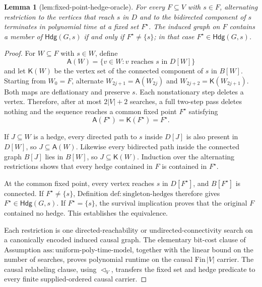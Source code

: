 \documentclass{article}
\newtheorem{lemma}{Lemma}
\begin{document}
\begin{lemma}[lem:fixed-point-hedge-oracle]\label{lem:fixed-point-hedge-oracle}
For every \(F\subseteq V\) with \(s\in F\), alternating restriction to the
vertices that reach \(s\) in \(D\) and to the bidirected component of \(s\)
terminates in polynomial time at a fixed set \(F^{\star}\).  The induced
graph on \(F\) contains a member of \(\mathsf{Hdg}(G,s)\) if and only if
\(F^{\star}\neq\{s\}\); in that case \(F^{\star}\in\mathsf{Hdg}(G,s)\).
\end{lemma}
\begin{proof}
For \(W\subseteq F\) with \(s\in W\), define
\[
 \mathsf A(W)=\{v\in W:v\text{ reaches }s\text{ in }D[W]\}
\]
and let \(\mathsf K(W)\) be the vertex set of the connected component of
\(s\) in \(B[W]\).  Starting from \(W_0=F\), alternate
\(W_{2j+1}=\mathsf A(W_{2j})\) and
\(W_{2j+2}=\mathsf K(W_{2j+1})\).  Both maps are deflationary and preserve
\(s\).  Each nonstationary step deletes a vertex.  Therefore, after at most
\(2|V|+2\) searches, a full two-step pass deletes nothing and the sequence
reaches a common fixed point \(F^{\star}\) satisfying
\[
 \mathsf A(F^{\star})=\mathsf K(F^{\star})=F^{\star}.
\]

If \(J\subseteq W\) is a hedge, every directed path to \(s\) inside
\(D[J]\) is also present in \(D[W]\), so \(J\subseteq\mathsf A(W)\).
Likewise every bidirected path inside the connected graph \(B[J]\) lies in
\(B[W]\), so \(J\subseteq\mathsf K(W)\).  Induction over the alternating
restrictions shows that every hedge contained in \(F\) is contained in
\(F^{\star}\).

At the common fixed point, every vertex reaches \(s\) in
\(D[F^{\star}]\), and \(B[F^{\star}]\) is connected.  If
\(F^{\star}\neq\{s\}\), Definition
\(\mathrm{def{:}singleton\mbox{-}hedges}\) therefore gives
\(F^{\star}\in\mathsf{Hdg}(G,s)\).  If
\(F^{\star}=\{s\}\), the survival implication proves that the original
\(F\) contained no hedge.  This establishes the equivalence.

Each restriction is one directed-reachability or undirected-connectivity
search on a canonically encoded induced causal graph.  The elementary
bit-cost clause of Assumption
\(\mathrm{ass{:}uniform\mbox{-}poly\mbox{-}time\mbox{-}model}\), together
with the linear bound on the number of searches, proves polynomial runtime
on the causal \(\mathrm{Fin}\,|V|\) carrier.  The causal relabeling clause,
using \(\triangleleft_V\), transfers the fixed set and hedge predicate to
every finite supplied-ordered causal carrier.
\end{proof}
\end{document}
